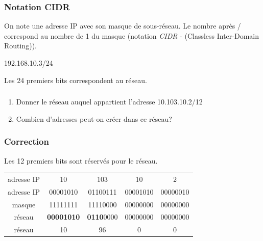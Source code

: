 \documentclass[svgnames,11pt]{beamer}
\begin{document}
\begin{frame}
    \frametitle{Notation CIDR}

    \begin{aretenir}[]
        On note une adresse IP avec son masque de sous-réseau. Le nombre après / correspond au nombre de 1 du masque (notation \emph{CIDR} - (Classless Inter-Domain Routing)).
        \begin{center}
            192.168.10.3/24
        \end{center}
        Les 24 premiers bits correspondent au réseau.
    \end{aretenir}

\end{frame}
\begin{frame}
    \frametitle{}

    \begin{activite}
        \begin{enumerate}
            \item Donner le réseau auquel appartient l'adresse 10.103.10.2/12
            \item Combien d'adresses peut-on créer dans ce réseau?
        \end{enumerate}
    \end{activite}

\end{frame}
\begin{frame}
    \frametitle{Correction}
    Les 12 premiers bits sont réservés pour le réseau.
    \begin{center}
        \begin{tabular}{ccccc}
            adresse IP & 10                & 103               & 10       & 2        \\
            adresse IP & 00001010          & 01100111          & 00001010 & 00000010 \\
            masque     & 11111111          & 11110000          & 00000000 & 00000000 \\
            réseau     & \textbf{00001010} & \textbf{0110}0000 & 00000000 & 00000000 \\
            réseau     & 10                & 96                & 0        & 0        \\
        \end{tabular}
    \end{center}

\end{frame}
\end{document}
